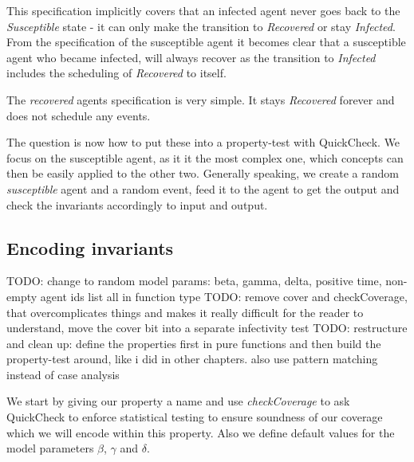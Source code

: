 This specification implicitly covers that an infected agent never goes back to the \textit{Susceptible} state - it can only make the transition to \textit{Recovered} or stay \textit{Infected}. From the specification of the susceptible agent it becomes clear that a susceptible agent who became infected, will always recover as the transition to \textit{Infected} includes the scheduling of \textit{Recovered} to itself. 

\medskip

The \textit{recovered} agents specification is very simple. It stays \textit{Recovered} forever and does not schedule any events.

\medskip

The question is now how to put these into a property-test with QuickCheck. We focus on the susceptible agent, as it it the most complex one, which concepts can then be easily applied to the other two. Generally speaking, we create a random \textit{susceptible} agent and a random event, feed it to the agent to get the output and check the invariants accordingly to input and output. %

\subsection{Encoding invariants}
TODO: change to random model params: beta, gamma, delta, positive time, non-empty agent ids list all in function type
TODO: remove cover and checkCoverage, that overcomplicates things and makes it really difficult for the reader to understand, move the cover bit into a separate infectivity test
TODO: restructure and clean up: define the properties first in pure functions and then build the property-test around, like i did in other chapters. also use pattern matching instead of case analysis

We start by giving our property a name and use \textit{checkCoverage} to ask QuickCheck to enforce statistical testing to ensure soundness of our coverage which we will encode within this property. Also we define default values for the model parameters $\beta$, $\gamma$ and $\delta$.

